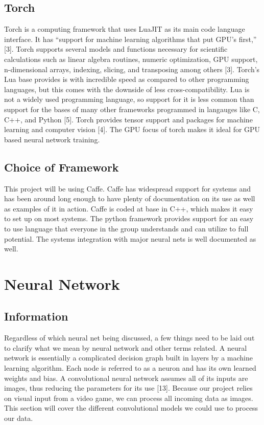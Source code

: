 \documentclass{scrreprt}
\begin{document}
\subsection{Torch}
Torch is a computing framework that uses LuaJIT as its main code language interface. It has
“support for machine learning algorithms that put GPU’s first,” [3]. Torch supports several
models and functions necessary for scientific calculations such as linear algebra routines,
numeric optimization, GPU support, n-dimensional arrays, indexing, slicing, and transposing
among others [3]. Torch’s Lua base provides is with incredible speed as compared to other
programming languages, but this comes with the downside of less cross-compatibility. Lua is not
a widely used programming language, so support for it is less common than support for the bases
of many other frameworks programmed in langauges like C, C++, and Python [5]. Torch
provides tensor support and packages for machine learning and computer vision [4]. The GPU
focus of torch makes it ideal for GPU based neural network training.

\subsection{Choice of Framework}

This project will be using Caffe. Caffe has widespread support for systems and has been around
long enough to have plenty of documentation on its use as well as examples of it in action. Caffe
is coded at base in C++, which makes it easy to set up on most systems. The python framework
provides support for an easy to use language that everyone in the group understands and can
utilize to full potential. The systems integration with major neural nets is well documented as
well.

\section{Neural Network}

\subsection{Information}
Regardless of which neural net being discussed, a few things need to be laid out to clarify what
we mean by neural network and other terms related. A neural network is essentially a
complicated decision graph built in layers by a machine learning algorithm. Each node is
referred to as a neuron and has its own learned weights and bias. A convolutional neural network
assumes all of its inputs are images, thus reducing the parameters for its use [13]. Because our
project relies on visual input from a video game, we can process all incoming data as images.
This section will cover the different convolutional models we could use to process our data.
\end{document}
